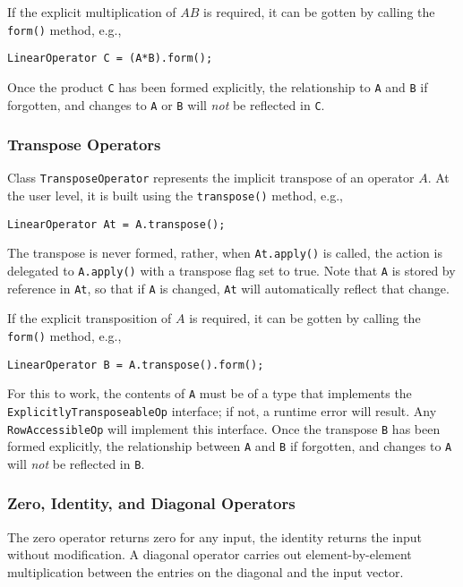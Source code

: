 If the explicit multiplication of $AB$ is required, it can be gotten by
calling the \verb+form()+ method, e.g., 
{\scriptsize\begin{verbatim}
LinearOperator C = (A*B).form();
\end{verbatim}}
Once the product \verb+C+ has been formed explicitly, the relationship to 
\verb+A+ and  \verb+B+ if forgotten, and 
changes to \verb+A+ or \verb+B+ will {\it not} be reflected
in \verb+C+.

\subsubsection{Transpose Operators}

Class \verb+TransposeOperator+ represents the implicit transpose of an operator $A$. 
At the user level, it is built using the \verb+transpose()+ method,
e.g.,
{\scriptsize\begin{verbatim}
LinearOperator At = A.transpose();
\end{verbatim}}
The transpose is never formed, rather, when \verb+At.apply()+ is called,
the action is delegated to \verb+A.apply()+ with a transpose flag set to true.
Note that  \verb+A+ is stored by reference in \verb+At+, so that if \verb+A+
is changed,  \verb+At+ will automatically reflect that change.

If the explicit transposition of $A$ is required, it can be gotten by
calling the \verb+form()+ method, e.g., 
{\scriptsize\begin{verbatim}
LinearOperator B = A.transpose().form();
\end{verbatim}}
For this to work, the contents of \verb+A+ must be of a type that implements the 
\verb+ExplicitlyTransposeableOp+ interface; if not, a runtime error will result.
Any \verb+RowAccessibleOp+ will implement this interface.
Once the transpose \verb+B+ has been formed explicitly, the relationship
between  \verb+A+ and  \verb+B+ if forgotten, 
and changes to \verb+A+ will {\it not} be reflected
in \verb+B+. 

\subsubsection{Zero, Identity, and Diagonal Operators}

The zero operator returns zero for any input, the identity returns the input
without modification. A diagonal operator carries out element-by-element 
multiplication between the entries on the diagonal and the input vector.

